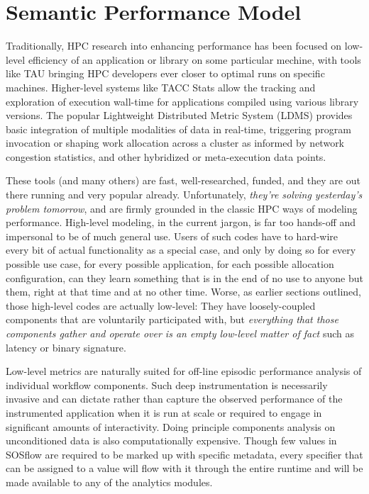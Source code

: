 
\section{Semantic Performance Model}

Traditionally, HPC research into enhancing performance has been
focused on low-level efficiency of an application or library on some
particular mechine, with tools like TAU bringing HPC developers ever
closer to optimal runs on specific machines.
%
Higher-level systems like TACC Stats \cite{evans2014comprehensive}
allow the tracking and exploration of execution wall-time for
applications compiled using various library versions.
%
The popular Lightweight Distributed Metric System (LDMS)
\cite{agelastos2014lightweight} provides basic integration of multiple
modalities of data in real-time, triggering program invocation or
shaping work allocation across a cluster as informed by network
congestion statistics, and other hybridized or meta-execution data
points.

These tools (and many others) are fast, well-researched, funded, and
they are out there running and very popular already.
%
Unfortunately, \textit{they're solving yesterday's problem tomorrow},
and are firmly grounded in the classic HPC ways of modeling
performance.
%
High-level modeling, in the current jargon, is far too hands-off and
impersonal to be of much general use.
%
Users of such codes have to hard-wire every bit of actual
functionality as a special case, and only by doing so for every
possible use case, for every possible application, for each possible
allocation configuration, can they learn something that is in the end
of no use to anyone but them, right at that time and at no other
time.
%
Worse, as earlier sections outlined, those high-level codes are
actually low-level: They have loosely-coupled components that are
voluntarily participated with, but \textit{everything that those
  components gather and operate over is an empty low-level matter of
  fact} such as latency or binary signature.

Low-level metrics are naturally suited for off-line episodic
performance analysis of individual workflow components.
%
Such deep instrumentation is necessarily invasive and can dictate
rather than capture the observed performance of the instrumented
application when it is run at scale or required to engage in
significant amounts of interactivity.
%
Doing principle components analysis on unconditioned data is also
computationally expensive.
%
Though few values in SOSflow are required to be marked up with
specific metadata, every specifier that can be assigned to a value
will flow with it through the entire runtime and will be made
available to any of the analytics modules.

